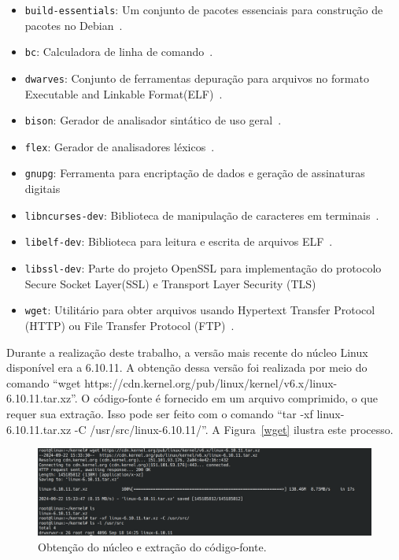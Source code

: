 \documentclass[
	12pt,				%
	oneside,   	        %
	a4paper,			%
	english,			%
	french,				%
	spanish,			%
	brazil,				%
	]{pacotes/abntex2}
\begin{document}
\begin{itemize}
    \item \texttt{build-essentials}: Um conjunto de pacotes essenciais para construção de pacotes no Debian~\cite{buildEssentials}.

    \item \texttt{bc}: Calculadora de linha de comando~\cite{manBc}.

    \item \texttt{dwarves}: Conjunto de ferramentas depuração para arquivos no formato Executable and Linkable Format(ELF)~\cite{debianDwarf}.

    \item \texttt{bison}: Gerador de analisador sintático de uso geral~\cite{debianBison}. 

    \item \texttt{flex}: Gerador de analisadores léxicos~\cite{debianFlex}.
    
    \item \texttt{gnupg}: Ferramenta para encriptação de dados e geração de assinaturas digitais~\cite{debianGnupg}

    \item \texttt{libncurses-dev}: Biblioteca de manipulação de caracteres em terminais~\cite{debianLibncurses}.

    \item \texttt{libelf-dev}: Biblioteca para leitura e escrita de arquivos ELF~\cite{debianLibelf}.
    
    \item \texttt{libssl-dev}: Parte do projeto OpenSSL para implementação do protocolo Secure Socket Layer(SSL) e Transport Layer Security (TLS)~\cite{debianLibssl}

    \item \texttt{wget}: Utilitário para obter arquivos usando Hypertext Transfer Protocol (HTTP) ou File Transfer Protocol (FTP)~\cite{debianWget}.
\end{itemize}

Durante a realização deste trabalho, a versão mais recente do núcleo Linux disponível era a 6.10.11. A obtenção dessa versão foi realizada por meio do comando ``wget https://cdn.kernel.org/pub/linux/kernel/v6.x/linux-6.10.11.tar.xz''. O código-fonte é fornecido em um arquivo comprimido, o que requer sua extração. Isso pode ser feito com o comando ``tar -xf linux-6.10.11.tar.xz -C /usr/src/linux-6.10.11/''. A Figura~\ref{wget} ilustra este processo.

\begin{figure}[H]
  \centering
  \includegraphics[scale=0.3]{figuras/wget.png}
  \caption{Obtenção do núcleo e extração do código-fonte.}
  \label{fig:wget}
\end{figure}
\end{document}
